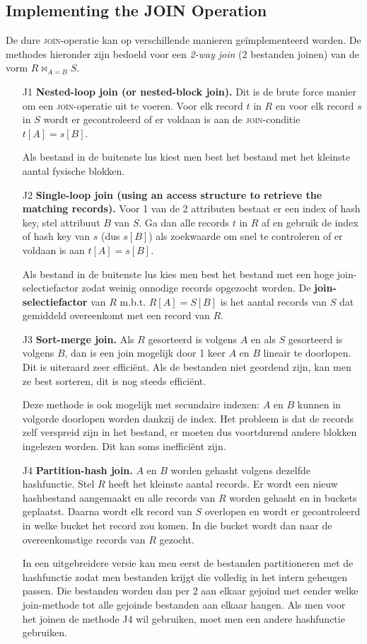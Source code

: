 \subsection{Implementing the JOIN Operation}
De dure \textsc{join}-operatie kan op verschillende manieren ge\"implementeerd worden. De methodes hieronder zijn bedoeld voor een \textit{2-way join} (2 bestanden joinen) van de vorm $R\bowtie_{A=B}S$.
\begin{itemize}
	\item[J1] \textbf{Nested-loop join (or nested-block join).} Dit is de brute force manier om een \textsc{join}-operatie uit te voeren. Voor elk record $t$ in $R$ en voor elk record $s$ in $S$ wordt er gecontroleerd of er voldaan is aan de \textsc{join}-conditie $t[A] = s[B]$.
	
	Als bestand in de buitenste lus kiest men best het bestand met het kleinste aantal fysische blokken.
	
	\item[J2] \textbf{Single-loop join (using an access structure to retrieve the matching records).} Voor 1 van de 2 attributen bestaat er een index of hash key, stel attribuut $B$ van $S$. Ga dan alle records $t$ in $R$ af en gebruik de index of hash key van $s$ (dus $s[B]$) als zoekwaarde om snel te controleren of er voldaan is aan $t[A] = s[B]$.
	
	Als bestand in de buitenste lus kies men best het bestand met een hoge join-selectiefactor zodat weinig onnodige records opgezocht worden. De \textbf{join-selectiefactor} van $R$ m.b.t. $R[A] = S[B]$ is het aantal records van $S$ dat gemiddeld overeenkomt met een record van $R$.

	\item[J3] \textbf{Sort-merge join.} Als $R$ gesorteerd is volgens $A$ en als $S$ gesorteerd is volgens $B$, dan is een join mogelijk door 1 keer $A$ en $B$ lineair te doorlopen. Dit is uiteraard zeer effici\"ent. Als de bestanden niet geordend zijn, kan men ze best sorteren, dit is nog steeds effici\"ent.
	
	Deze methode is ook mogelijk met secundaire indexen: $A$ en $B$ kunnen in volgorde doorlopen worden dankzij de index. Het probleem is dat de records zelf verspreid zijn in het bestand, er moeten dus voortdurend andere blokken ingelezen worden. Dit kan soms ineffici\"ent zijn.
	
	\item[J4] \textbf{Partition-hash join.} $A$ en $B$ worden gehasht volgens dezelfde hashfunctie. Stel $R$ heeft het kleinste aantal records. Er wordt een nieuw hashbestand aangemaakt en alle records van $R$ worden gehasht en in buckets geplaatst. Daarna wordt elk record van $S$ overlopen en wordt er gecontroleerd in welke bucket het record zou komen. In die bucket wordt dan naar de overeenkomstige records van $R$ gezocht.
	
	In een uitgebreidere versie kan men eerst de bestanden partitioneren met de hashfunctie zodat men bestanden krijgt die volledig in het intern geheugen passen. Die bestanden worden dan per 2 aan elkaar gejoind met eender welke join-methode tot alle gejoinde bestanden aan elkaar hangen. Als men voor het joinen de methode J4 wil gebruiken, moet men een andere hashfunctie gebruiken.
\end{itemize}
